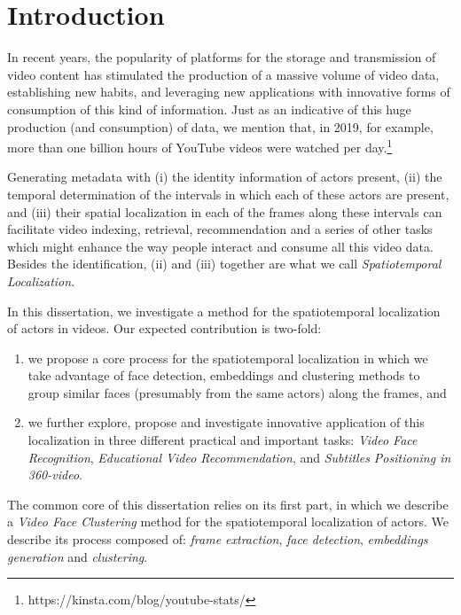 \newpage

\chapter{Introduction}
\label{chap:introduction}

In recent years, the popularity of platforms for the storage and transmission of video content has stimulated the production of a massive volume of video data, establishing new habits, and leveraging new applications with innovative forms of consumption of this kind of information.
Just as an indicative of this huge production (and consumption) of data, we mention that, in 2019, for example, more than one billion hours of YouTube videos were watched per day.\footnote{https://kinsta.com/blog/youtube-stats/}

Generating metadata with (i) the identity information of  actors present, (ii) the temporal determination of the intervals in which each of these actors are present, and (iii) their spatial localization in each of the frames along these intervals can facilitate video indexing, retrieval, recommendation and a series of other tasks which might enhance the way people interact and consume all this video data. Besides the identification, (ii) and (iii) together are what we call \textit{Spatiotemporal Localization}. 

In this dissertation, we investigate a method for the spatiotemporal localization of actors in videos. Our expected contribution is two-fold: 
\begin{enumerate}
\item we propose a core process for the spatiotemporal localization in which we take advantage of face detection, embeddings and clustering methods to group similar faces (presumably from the same actors) along the frames, and \item we further explore, propose and investigate innovative application of this localization in three different practical and important tasks: \emph{Video Face Recognition}, \emph{Educational Video Recommendation}, and \emph{Subtitles Positioning in 360-video}.  
\end{enumerate}

The common core of this dissertation relies on its first part, in which we describe a \textit{Video Face Clustering} method for the spatiotemporal localization of actors. We describe its process composed of: \textit{frame extraction}, \textit{face detection}, \textit{embeddings generation} and \textit{clustering}. 

